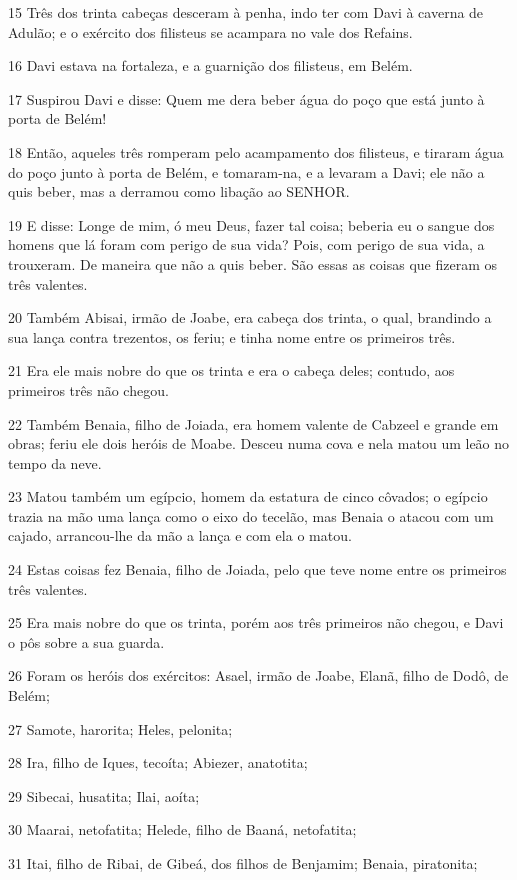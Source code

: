 \par 15 Três dos trinta cabeças desceram à penha, indo ter com Davi à caverna de Adulão; e o exército dos filisteus se acampara no vale dos Refains.
\par 16 Davi estava na fortaleza, e a guarnição dos filisteus, em Belém.
\par 17 Suspirou Davi e disse: Quem me dera beber água do poço que está junto à porta de Belém!
\par 18 Então, aqueles três romperam pelo acampamento dos filisteus, e tiraram água do poço junto à porta de Belém, e tomaram-na, e a levaram a Davi; ele não a quis beber, mas a derramou como libação ao SENHOR.
\par 19 E disse: Longe de mim, ó meu Deus, fazer tal coisa; beberia eu o sangue dos homens que lá foram com perigo de sua vida? Pois, com perigo de sua vida, a trouxeram. De maneira que não a quis beber. São essas as coisas que fizeram os três valentes.
\par 20 Também Abisai, irmão de Joabe, era cabeça dos trinta, o qual, brandindo a sua lança contra trezentos, os feriu; e tinha nome entre os primeiros três.
\par 21 Era ele mais nobre do que os trinta e era o cabeça deles; contudo, aos primeiros três não chegou.
\par 22 Também Benaia, filho de Joiada, era homem valente de Cabzeel e grande em obras; feriu ele dois heróis de Moabe. Desceu numa cova e nela matou um leão no tempo da neve.
\par 23 Matou também um egípcio, homem da estatura de cinco côvados; o egípcio trazia na mão uma lança como o eixo do tecelão, mas Benaia o atacou com um cajado, arrancou-lhe da mão a lança e com ela o matou.
\par 24 Estas coisas fez Benaia, filho de Joiada, pelo que teve nome entre os primeiros três valentes.
\par 25 Era mais nobre do que os trinta, porém aos três primeiros não chegou, e Davi o pôs sobre a sua guarda.
\par 26 Foram os heróis dos exércitos: Asael, irmão de Joabe, Elanã, filho de Dodô, de Belém;
\par 27 Samote, harorita; Heles, pelonita;
\par 28 Ira, filho de Iques, tecoíta; Abiezer, anatotita;
\par 29 Sibecai, husatita; Ilai, aoíta;
\par 30 Maarai, netofatita; Helede, filho de Baaná, netofatita;
\par 31 Itai, filho de Ribai, de Gibeá, dos filhos de Benjamim; Benaia, piratonita;
